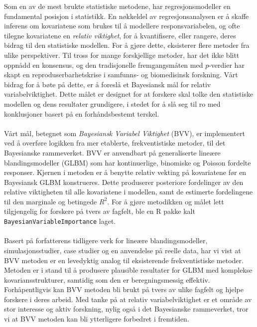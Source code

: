 Som en av de mest brukte statistiske metodene, har regresjonsmodeller en fundamental posisjon i statistikk. En nøkkeldel av regresjonsanalysen er å skaffe inferens om kovariatene som brukes til å modellere responsvariabelen, og ofte tilegne kovariatene en \textit{relativ viktighet}, for å kvantifisere, eller rangere, deres bidrag til den statistiske modellen. For å gjøre dette, eksisterer flere metoder fra ulike perspektiver. Til tross for mange forskjellige metoder, har det ikke blitt oppnådd en konsensus, og den tradisjonelle fremgangsmåten med $p$-verdier har skapt en reproduserbarhetskrise i samfunns- og biomedisinsk forskning. Vårt bidrag for å bøte på dette, er å foreslå et Bayesiansk mål for relativ variabelviktighet. Dette målet er designet for at forskere skal tolke den statistiske modellen og dens resultater grundigere, i stedet for å slå seg til ro med konklusjoner basert på en forhåndsbestemt terskel.
\\
\\
Vårt mål, betegnet som \textit{Bayesiansk Variabel Viktighet} (BVV), er implementert ved å overføre logikken fra mer etablerte, frekventistiske metoder, til det Bayesianske rammeverket. BVV er anvendbart på generaliserte lineære blandingsmodeller (GLBM) som har kontinuerlige, binomiske og Poisson fordelte responser. Kjernen i metoden er å benytte relativ vekting på kovariatene før en Bayesiansk GLBM konstrueres. Dette produserer posteriore fordelinger av den relative viktigheten til alle kovariatene i modellen, samt de estimerte fordelingene til den marginale og betingede $R^2$. For å gjøre metodikken og målet lett tilgjengelig for forskere på tvers av fagfelt, ble en R pakke kalt \texttt{BayesianVariableImportance} laget.
\\
\\
Basert på forfatterens tidligere verk \citet{Arnstad:Relative_variable_importance_in_Bayesian_linear_mixed_models:2024} for lineære blandingsmodeller, simulasjonsstudier, case studier og en anvendelse på reelle data, har vi vist at BVV metoden er en levedyktig analog til eksisterende frekventistiske metoder. Metoden er i stand til å produsere plausible resultater for GLBM med komplekse kovariansstrukturer, samtidig som den er beregningsmessig effektiv. Forhåpentligvis kan BVV metoden bli brukt på tvers av ulike fagfelt og hjelpe forskere i deres arbeid. Med tanke på at relativ variabelviktighet er et område av stor interesse og aktiv forskning, nylig også i det Bayesianske rammeverket, tror vi at BVV metoden kan bli ytterligere forbedret i fremtiden.